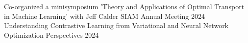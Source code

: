 

\begingroup
\begin{cvtalks}

\cvtalk
    {Co-organized a minisymposium 'Theory and Applications of Optimal Transport in Machine Learning' with Jeff Calder} %
    {SIAM Annual Meeting 2024}
    {Understanding Contrastive Learning from Variational and Neural Network Optimization Perspectives} %
    {2024} %
\end{cvtalks}
\endgroup

